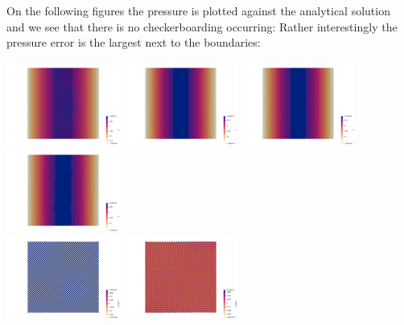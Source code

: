 On the following figures the pressure is plotted against the analytical solution and 
we see that there is no checkerboarding occurring:
Rather interestingly the pressure error is the largest next to the boundaries:

\begin{center}
\includegraphics[width=3.74cm]{python_codes/fieldstone_78/results/mms/p_0}
\includegraphics[width=3.74cm]{python_codes/fieldstone_78/results/mms/p_1}
\includegraphics[width=3.74cm]{python_codes/fieldstone_78/results/mms/p_2}
\includegraphics[width=3.74cm]{python_codes/fieldstone_78/results/mms/p_3}\\
\includegraphics[width=3.74cm]{python_codes/fieldstone_78/results/mms/p_error_0}
\includegraphics[width=3.74cm]{python_codes/fieldstone_78/results/mms/p_error_1}

\end{center}
